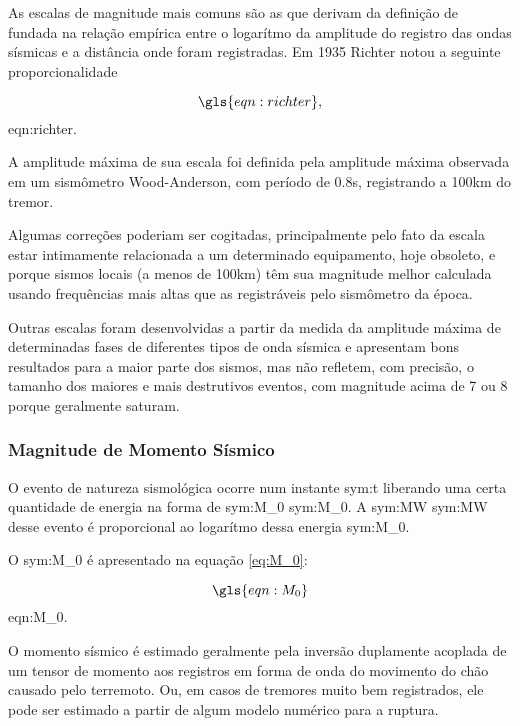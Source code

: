 As escalas de magnitude mais comuns são as que derivam da definição de \citet{richter_1935}
fundada na relação empírica entre o logarítmo da amplitude do registro das ondas sísmicas e a distância onde foram
registradas. Em 1935 Richter notou a seguinte proporcionalidade

\begin{equation}
	\gls{eqn:richter},
	\label{eq:richter}
\end{equation}
\glsdesc*{eqn:richter}.


A amplitude máxima de sua
escala foi definida pela amplitude máxima observada em um sismômetro Wood-Anderson, com período de 0.8s, registrando a 100km 
do tremor.

Algumas correções poderiam ser cogitadas, principalmente pelo fato da escala estar intimamente 
relacionada a um determinado equipamento, hoje obsoleto, e porque sismos locais (a menos de 100km) têm sua magnitude
melhor calculada usando frequências mais altas que as registráveis pelo sismômetro da época.


Outras escalas foram desenvolvidas a partir da medida da amplitude máxima de determinadas fases 
de diferentes tipos de onda sísmica e apresentam bons resultados para a maior parte dos sismos, 
mas não refletem, com precisão, 
o tamanho dos maiores e mais destrutivos eventos, com magnitude acima de 7 ou 8 porque geralmente saturam.


\subsubsection{Magnitude de Momento Sísmico }
\label{sec:momento_sismico}

O evento de natureza sismológica ocorre num
instante \gls{sym:t} liberando uma certa quantidade de energia na forma de \glsdesc{sym:M_0}
\gls{sym:M_0}. A \glsdesc{sym:MW} \gls{sym:MW} desse evento é proporcional ao logarítmo dessa energia 
\gls{sym:M_0}.

O \glsdesc{sym:M_0} é apresentado na equação \eqref{eq:M_0}:

\begin{equation}
	\gls{eqn:M_0}
	\label{eq:M_0}
\end{equation}
\glsdesc*{eqn:M_0}.

O momento sísmico é estimado geralmente pela inversão duplamente acoplada de um tensor de momento aos registros em 
forma de onda do movimento do chão causado pelo terremoto. Ou, em casos de tremores muito bem registrados, ele pode
ser estimado a partir de algum modelo numérico para a ruptura.


